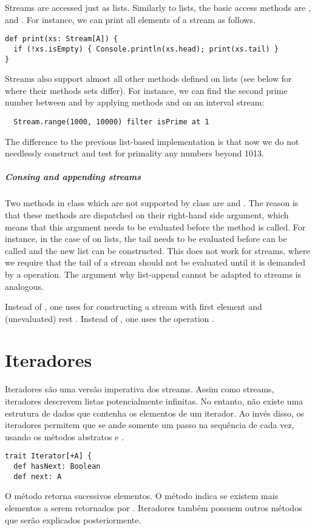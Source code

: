 {Streams are accessed just as lists. Similarly to lists, the basic access
methods are ,  and . For instance,
we can print all elements of a stream as follows.
\begin{lstlisting}
def print(xs: Stream[A]) {
  if (!xs.isEmpty) { Console.println(xs.head); print(xs.tail) }
}
\end{lstlisting}
Streams also support almost all other methods defined on lists (see
below for where their methods sets differ). For instance, we can find
the second prime number between  and  by applying methods
 and  on an interval stream:
\begin{lstlisting}
  Stream.range(1000, 10000) filter isPrime at 1
\end{lstlisting}
The difference to the previous list-based implementation is that now
we do not needlessly construct and test for primality any numbers
beyond 1013.

\paragraph{Consing and appending streams} Two methods in class 
which are not supported by class  are \code{::} and
\code{:::}.  The reason is that these methods are dispatched on their
right-hand side argument, which means that this argument needs to be
evaluated before the method is called. For instance, in the case of
 on lists, the tail  needs to be evaluated
before \code{::} can be called and the new list can be constructed.
This does not work for streams, where we require that the tail of a
stream should not be evaluated until it is demanded by a  operation.
The argument why list-append \code{:::} cannot be adapted to streams is analogous.

Instead of , one uses  for
constructing a stream with first element  and (unevaluated)
rest .  Instead of , one uses the operation
.  

\chapter{Iteradores}

Iteradores s\~{a}o uma vers\~{a}o imperativa dos streams. Assim como streams,
iteradores descrevem listas potencialmente infinitas. No entanto, não existe uma estrutura de dados
que contenha os elementos de um iterador. Ao invés disso, os iteradores permitem que se ande somente um passo
na sequ\^{e}ncia de cada vez, usando os métodos abstratos  e .
\begin{lstlisting}
trait Iterator[+A] {
  def hasNext: Boolean
  def next: A
\end{lstlisting}
O método  retorna sucessivos elementos.  O método 
indica se existem mais elementos a serem retornados por
. Iteradores também possuem outros métodos que serão explicados posteriormente.

}
